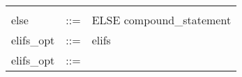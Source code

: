 \documentclass[11pt]{article}
\begin{document}
\begin{longtable}{lrl}
\begin{minipage}[t]{\rulerhs}
  \end{minipage}                                                             \\
else                                       & ::= &
  \begin{minipage}[t]{\rulerhs}
    \raggedright
    ELSE compound\_statement
  \end{minipage}                                                             \\
elifs\_opt                                 & ::= &
  \begin{minipage}[t]{\rulerhs}
    \raggedright
    elifs
  \end{minipage}                                                             \\
elifs\_opt                                 & ::= &
  \begin{minipage}[t]{\rulerhs}
    \raggedright
    

\end{minipage}
\end{longtable}
\end{document}
